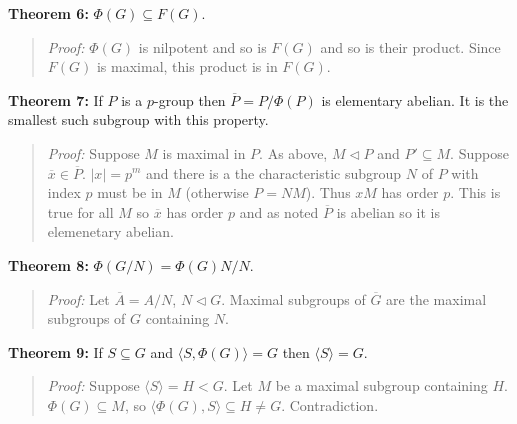 {\bf Theorem 6:} $\Phi(G) \subseteq F(G)$.
\begin{quote}
\emph{Proof:} $\Phi(G)$ is nilpotent and so is $F(G)$ and so is their product.  Since
$F(G)$ is maximal, this product is in $F(G)$.
\end{quote}
{\bf Theorem 7:} If $P$ is a $p$-group then ${\overline P}= P/\Phi(P)$ is elementary abelian.  It
is the smallest such subgroup with this property.
\begin{quote}
\emph{Proof:}  Suppose $M$ is maximal in $P$.  As above, $M \lhd P$ and $P' \subseteq M$.
Suppose ${\overline x} \in {\overline P}$.  $|x|= p^m$ and there is a the characteristic
subgroup $N$ of $P$ with index $p$ must be in $M$ (otherwise $P=NM$).  
Thus $xM$ has order $p$.  This is
true for all $M$ so ${\overline x}$ has order $p$ and as noted ${\overline P}$ is abelian so
it is elemenetary abelian.
\end{quote}
{\bf Theorem 8:} $\Phi(G/N)= \Phi(G)N/N$.
\begin{quote}
\emph{Proof:} Let ${\overline A}= A/N$, $N \lhd G$.  Maximal subgroups of ${\overline G}$ are
the maximal subgroups of $G$ containing $N$.
\end{quote}
{\bf Theorem 9:} If $S \subseteq G$ and $ \langle S, \Phi(G) \rangle =G$ then $ \langle S \rangle
=G$.
\begin{quote}
\emph{Proof:}  Suppose $ \langle S \rangle
=H < G$. Let  $M$ be a maximal subgroup containing $H$.  
$\Phi(G) \subseteq M$, so $ \langle \Phi(G), S \rangle \subseteq H \ne G$.  Contradiction.
\end{quote}
